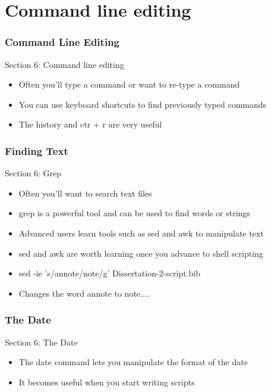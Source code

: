 \part{Command line editing}
\begin{frame}
\partpage
\end{frame}

\section{Command Line Editing}
\begin{frame}{Section 6: Command line editing}
\begin{itemize}
\item Often you'll type a command or want to re-type a command
\item You can use keyboard shortcuts to find previously typed commands
\item The history and ctr + r are very useful
\end{itemize}
\end{frame}

\section{Finding Text}
\begin{frame}{Section 6: Grep}
\begin{itemize}
\item Often you'll want to search text files
\item grep is a powerful tool and can be used to find words or strings
\item Advanced users learn tools such as sed and awk to manipulate text
\item sed and awk are worth learning once you advance to shell scripting
\item sed -ie 's/annote/note/g' Dissertation-2-script.bib
\item Changes the word annote to note....
\end{itemize}
\end{frame}

\section{The Date}
\begin{frame}{Section 6: The Date}
\begin{itemize}
\item The date command lets you manipulate the format of the date
\item It becomes useful when you start writing scripts
\end{itemize}
\end{frame}

